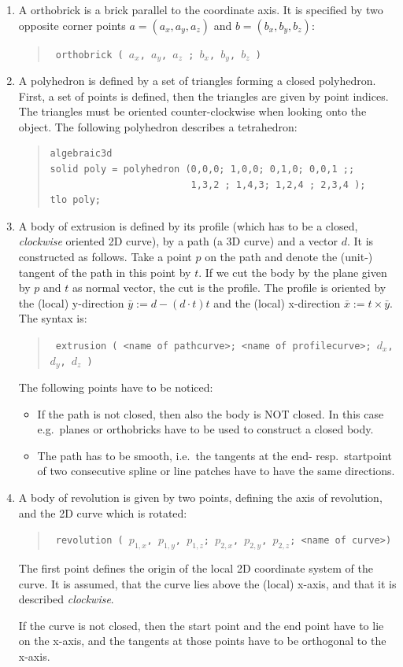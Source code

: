 \documentclass[12pt]{book}
\begin{document}
\begin{enumerate}
\item A orthobrick is a brick parallel to the coordinate axis. It is
  specified by two opposite corner points $a = (a_x, a_y, a_z)$ and
  $b = (b_x, b_y, b_z)$:
  \begin{quote}
    \tt
    orthobrick ( $a_x$, $a_y$, $a_z$ ; $b_x$, $b_y$, $b_z$  )
  \end{quote}
  
\item A polyhedron is defined by a set of triangles forming
  a closed polyhedron. First, a set of points is defined, then
  the triangles are given by point indices. The triangles must be
  oriented counter-clockwise when looking onto the object. The
  following polyhedron describes a tetrahedron:
  \begin{quote}
\begin{verbatim}
algebraic3d
solid poly = polyhedron (0,0,0; 1,0,0; 0,1,0; 0,0,1 ;;
                         1,3,2 ; 1,4,3; 1,2,4 ; 2,3,4 );
tlo poly;
\end{verbatim}
  \end{quote}

\item A body of extrusion is defined by its profile 
(which has to be a closed, \textit{clockwise} oriented 2D curve), by a path (a 3D curve) and a
vector $d$. It is constructed as follows. Take a point $p$ on the path and denote the (unit-) tangent of the path in this point by $t$.
If we cut the body by the plane given by $p$ and $t$ as normal vector, the cut is the profile. 
The profile is oriented by the (local) y-direction $\bar{y} := d - (d \cdot t) t$ and the (local) x-direction $\bar{x} := t \times \bar{y}$. The
syntax is:
\begin{quote}
  \tt
  extrusion ( <name of pathcurve>; <name of profilecurve>; $d_x$, $d_y$, $d_z$ )
\end{quote}
The following points have to be noticed:
\begin{itemize}
\item If the path is not closed, then also the body is NOT closed. In this case e.g.\ planes or orthobricks have to be used to construct
a closed body.
\item The path has to be smooth, i.e.\ the tangents at the end- resp.\ startpoint of two consecutive spline or line patches have
to have the same directions.
\end{itemize}

\item A body of revolution is given by two points, defining the axis of revolution, and the 2D curve which is rotated:
\begin{quote}
  \tt
  revolution ( $p_{1,x}$, $p_{1,y}$, $p_{1,z}$; $p_{2,x}$, $p_{2,y}$, $p_{2,z}$; <name of curve>)
\end{quote}
The first point defines the origin of the local 2D coordinate system of the curve. It is assumed, that the curve lies above the
(local) x-axis, and that it is described \textit{clockwise}.

If the curve is not closed, then the start point and the end point have to lie on the x-axis, and the tangents at those points
have to be orthogonal to the x-axis.
\end{enumerate}
\end{document}
